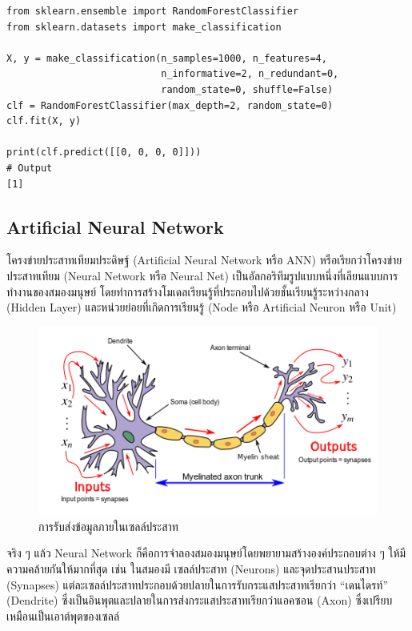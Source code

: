 \begin{lstlisting}[style=MyPython]
from sklearn.ensemble import RandomForestClassifier
from sklearn.datasets import make_classification

X, y = make_classification(n_samples=1000, n_features=4,
                           n_informative=2, n_redundant=0,
                           random_state=0, shuffle=False)
clf = RandomForestClassifier(max_depth=2, random_state=0)
clf.fit(X, y)

print(clf.predict([[0, 0, 0, 0]]))
# Output
[1]
\end{lstlisting}

\subsection{Artificial Neural Network}
\label{ssec:ann}

โครงข่ายประสาทเทียมประดิษฐ์ (Artificial Neural Network หรือ ANN) หรือเรียกว่าโครงข่ายประสาทเทียม (Neural Network หรือ
Neural Net) เป็นอัลกอริทึมรูปแบบหนึ่งที่เลียนแบบการทำงานของสมองมนุษย์ โดยทำการสร้างโมเดลเรียนรู้ที่ประกอบไปด้วยชั้นเรียนรู้ระหว่างกลาง
(Hidden Layer) และหน่วยย่อยที่เกิดการเรียนรู้ (Node หรือ Artificial Neuron หรือ Unit)

\begin{figure}[H]
    \centering
    \includegraphics[width=0.9\linewidth]{fig/neuron.png}
    \caption{การรับส่งข้อมูลภายในเซลล์ประสาท}
    \label{fig:neuron}
\end{figure}

จริง ๆ แล้ว Neural Network ก็คือการจำลองสมองมนุษย์โดยพยายามสร้างองค์ประกอบต่าง ๆ ให้มีความคล้ายกันให้มากที่สุด เช่น ในสมองมี%
เซลล์ประสาท (Neurons) และจุดประสานประสาท (Synapses) แต่ละเซลล์ประสาทประกอบด้วยปลายในการรับกระแสประสาทเรียกว่า
\enquote{เดนไดรท์} (Dendrite) ซึ่งเป็นอินพุตและปลายในการส่งกระแสประสาทเรียกว่าแอคซอน (Axon) ซึ่งเปรียบเหมือนเป็นเอาต์พุตของเซลล์

